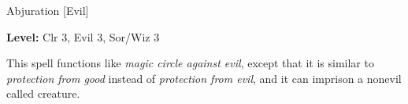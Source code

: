 
Abjuration [Evil]

\textbf{Level:} Clr 3, Evil 3, Sor/Wiz 3

This spell functions like \textit{magic circle against evil}, except that it is 
similar to \textit{protection from good} instead of \textit{protection from evil}, 
and it can imprison a nonevil called creature.

